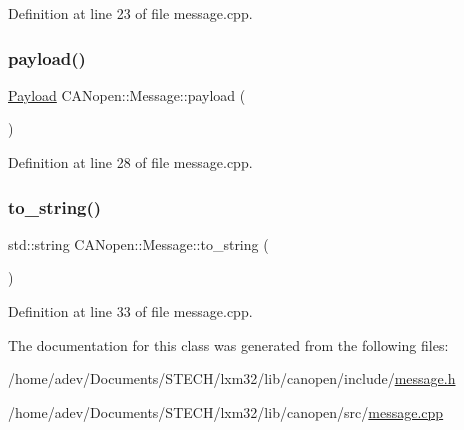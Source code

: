 Definition at line 23 of file message.\+cpp.

\mbox{\label{class_c_a_nopen_1_1_message_a65be4f77771803bed521cbbf2316271b}} 
\subsubsection{\texorpdfstring{payload()}{payload()}}
{\footnotesize\ttfamily \hyperlink{class_c_a_nopen_1_1_payload}{Payload} C\+A\+Nopen\+::\+Message\+::payload (\begin{DoxyParamCaption}{ }\end{DoxyParamCaption})}



Definition at line 28 of file message.\+cpp.

\mbox{\label{class_c_a_nopen_1_1_message_a0d3aade9268f612f1918d64e8c6057b7}} 
\subsubsection{\texorpdfstring{to\+\_\+string()}{to\_string()}}
{\footnotesize\ttfamily std\+::string C\+A\+Nopen\+::\+Message\+::to\+\_\+string (\begin{DoxyParamCaption}{ }\end{DoxyParamCaption})}



Definition at line 33 of file message.\+cpp.



The documentation for this class was generated from the following files\+:\begin{DoxyCompactItemize}
\item 
/home/adev/\+Documents/\+S\+T\+E\+C\+H/lxm32/lib/canopen/include/\hyperlink{message_8h}{message.\+h}\item 
/home/adev/\+Documents/\+S\+T\+E\+C\+H/lxm32/lib/canopen/src/\hyperlink{message_8cpp}{message.\+cpp}\end{DoxyCompactItemize}
